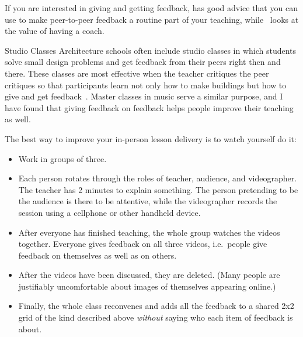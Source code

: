 If you are interested in giving and getting feedback,
\cite{Gorm2014} has good advice
that you can use to make peer-to-peer feedback a routine part of your teaching,
while~\cite{Gawa2011} looks at the value of having a coach.

\begin{aside}{Studio Classes}
  Architecture schools often include studio classes
  in which students solve small design problems
  and get feedback from their peers right then and there.
  These classes are most effective when the teacher critiques the peer critiques
  so that participants learn not only how to make buildings
  but how to give and get feedback~\cite{Scho1984}.
  Master classes in music serve a similar purpose,
  and I have found that giving feedback on feedback
  helps people improve their teaching as well.
\end{aside}


The best way to improve your in-person lesson delivery
is to watch yourself do it:

\begin{itemize}

\item
  Work in groups of three.

\item
  Each person rotates through the roles of teacher, audience, and videographer.
  The teacher has 2 minutes to explain something.
  The person pretending to be the audience is there to be attentive,
  while the videographer records the session using a cellphone or other handheld device.

\item
  After everyone has finished teaching,
  the whole group watches the videos together.
  Everyone gives feedback on all three videos,
  i.e.\ people give feedback on themselves as well as on others.

\item
  After the videos have been discussed,
  they are deleted.
  (Many people are justifiably uncomfortable about images of themselves appearing online.)

\item
  Finally,
  the whole class reconvenes
  and adds all the feedback to a shared 2x2 grid of the kind described above
  \emph{without} saying who each item of feedback is about.

\end{itemize}

